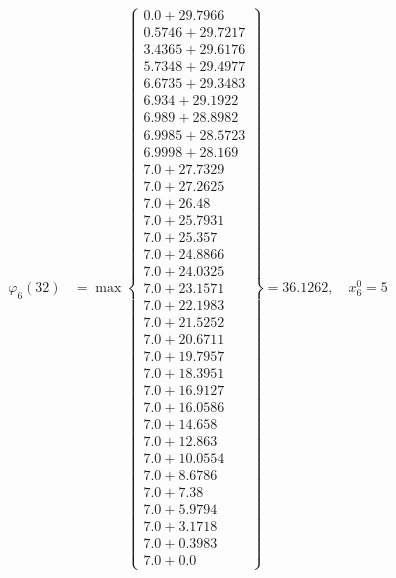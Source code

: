 \documentclass{article}
\begin{document}
\begin{align*}
\varphi_{6}(32) &= \max \left\{ \begin{array}{c}
0.0 + 29.7966 \\
 0.5746 + 29.7217 \\
 3.4365 + 29.6176 \\
 5.7348 + 29.4977 \\
 6.6735 + 29.3483 \\
 6.934 + 29.1922 \\
 6.989 + 28.8982 \\
 6.9985 + 28.5723 \\
 6.9998 + 28.169 \\
 7.0 + 27.7329 \\
 7.0 + 27.2625 \\
 7.0 + 26.48 \\
 7.0 + 25.7931 \\
 7.0 + 25.357 \\
 7.0 + 24.8866 \\
 7.0 + 24.0325 \\
 7.0 + 23.1571 \\
 7.0 + 22.1983 \\
 7.0 + 21.5252 \\
 7.0 + 20.6711 \\
 7.0 + 19.7957 \\
 7.0 + 18.3951 \\
 7.0 + 16.9127 \\
 7.0 + 16.0586 \\
 7.0 + 14.658 \\
 7.0 + 12.863 \\
 7.0 + 10.0554 \\
 7.0 + 8.6786 \\
 7.0 + 7.38 \\
 7.0 + 5.9794 \\
 7.0 + 3.1718 \\
 7.0 + 0.3983 \\
 7.0 + 0.0
\end{array} \right\}=36.1262, \quad x_{6}^0=5\\
  

\end{align*}
\end{document}
